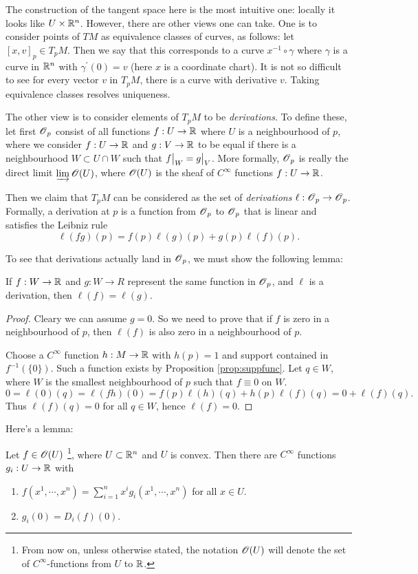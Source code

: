 \documentclass[11pt, english]{article}
\begin{document}
The construction of the tangent space here is the most intuitive one: locally it looks like $U \times \mathbb{R}^n$. However, there are other views one can take. One is to consider points of $TM$ as equivalence classes of curves, as follows: let $[x,v]_p \in T_pM$. Then we say that this corresponds to a curve $x^{-1} \circ \gamma$ where $\gamma$ is a curve in $\mathbb{R}^n$ with $\gamma^\prime(0) = v$ (here $x$ is a coordinate chart). It is not so difficult to see for every vector $v$ in $T_pM$, there is a curve with derivative $v$. Taking equivalence classes resolves uniqueness.

The other view is to consider elements of $T_pM$ to be \emph{derivations}. To define these, let first $\operatorname{\mathscr{O}}_p$ consist of all functions $f:U \to \mathbb{R}$ where $U$ is a neighbourhood of $p$, where we consider $f:U \to \mathbb{R}$ and $g:V \to \mathbb{R}$ to be equal if there is a neighbourhood $W \subset U \cap W$ such that $\restr{f}{W} = \restr{g}{V}$. More formally, $\operatorname{\mathscr{O}}_p$ is really the direct limit $\varinjlim \operatorname{\mathscr{O}}(U)$, where $\operatorname{\mathscr{O}}(U)$ is the sheaf of $C^\infty$ functions $f:U \to \mathbb{R}$.

Then we claim that $T_pM$ can be considered as the set of \emph{derivations} $\ell:\operatorname{\mathscr{O}}_p \to \operatorname{\mathscr{O}}_p$. Formally, a derivation at $p$ is a function from $\operatorname{\mathscr{O}}_p$ to $\operatorname{\mathscr{O}}_p$ that is linear and satisfies the Leibniz rule
\[
\ell(fg)(p) = f(p)\ell(g)(p) + g(p) \ell(f)(p).
\]

To see that derivations actually land in $\operatorname{\mathscr{O}}_p$, we must show the following lemma:
\begin{lemma}
If $f:W \to \mathbb{R}$ and $g:W \to R$ represent the same function in $\operatorname{\mathscr{O}}_p$, and $\ell$ is a derivation, then $\ell(f)=\ell(g)$.
\end{lemma}
\begin{proof}
Cleary we can assume $g=0$. So we need to prove that if $f$ is zero in a neighbourhood of $p$, then $\ell(f)$ is also zero in a neighbourhood of $p$.

Choose a $C^\infty$ function $h:M \to \mathbb{R}$ with $h(p)=1$ and support contained in $f^{-1}(\{ 0\})$. Such a function exists by Proposition \ref{prop:suppfunc}. Let $q \in W$, where $W$ is the smallest neighbourhood of $p$ such that $f \equiv 0$ on $W$.
\[
0 = \ell(0)(q) = \ell(fh)(0) = f(p)\ell(h)(q)+h(p)\ell(f)(q) = 0 + \ell(f)(q).
\]
Thus $\ell(f)(q)=0$ for all $q \in W$, hence $\ell(f)=0$.
\end{proof}

Here's a lemma:
\begin{lemma}
Let $f \in \operatorname{\mathscr{O}}(U)$ \footnote{From now on, unless otherwise stated, the notation $\operatorname{\mathscr{O}}(U)$ will denote the set of $C^\infty$-functions from $U$ to $\mathbb{R}$.}, where $U \subset \mathbb{R}^n$ and $U$ is convex. Then there are $C^\infty$ functions $g_i: U \to \mathbb{R}$ with
\begin{enumerate}
\item $f(x^1,\cdots,x^n) = \sum_{i=1} ^n x^i g_i(x^1,\cdots, x^n)$ for all $x \in U$.
\item $g_i(0) = D_i(f)(0)$.
\end{enumerate}
\end{lemma}
\end{document}

